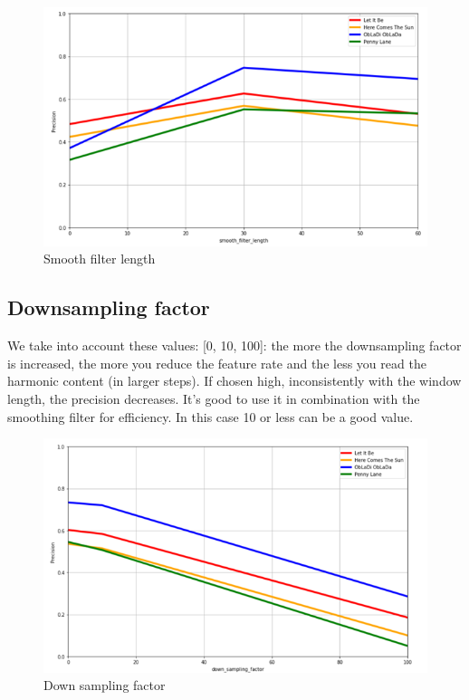 \documentclass[
	12pt, %
]{fphw}
\begin{document}
{\begin{figure}[H]
 \centering
 \includegraphics[scale=1]{./images/5_smooth_precision.png}
 \caption{Smooth filter length}
\end{figure}

\subsection*{Downsampling factor}

We take into account these values: [0, 10, 100]: the more the downsampling factor is increased, the more you reduce the feature rate and the less you read the harmonic content (in larger steps). If chosen high, inconsistently with the window length, the precision decreases.
It's good to use it in combination with the smoothing filter for efficiency. In this case 10 or less can be a good value.  

\begin{figure}[H]
 \centering
 \includegraphics[scale=1]{./images/5_down_sampling_precision.png}
 \caption{Down sampling factor}
\end{figure}

}
\end{document}
